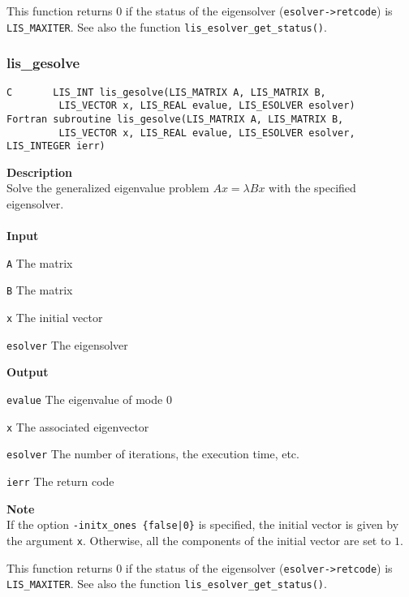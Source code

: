 \documentclass[a4paper]{article}
\newcommand{\namelistlabel}[1]{\mbox{#1}\hfill}
\newenvironment{namelist}[1]{%
\begin{list}{}
  {\let\makelabel\namelistlabel
  \settowidth{\labelwidth}{#1}
  \setlength{\leftmargin}{1.1\labelwidth}}
  }{%
\end{list}}
\begin{document}
This function returns 0 if the status of the eigensolver ({\tt esolver->retcode})
is {\tt LIS\_MAXITER}. See also the function
{\tt lis\_esolver\_get\_status()}. 

\newpage
\subsubsection{lis\_gesolve}
\begin{screen}
\verb|C       LIS_INT lis_gesolve(LIS_MATRIX A, LIS_MATRIX B,|\\ 
\verb|         LIS_VECTOR x, LIS_REAL evalue, LIS_ESOLVER esolver)|\\
\verb|Fortran subroutine lis_gesolve(LIS_MATRIX A, LIS_MATRIX B,|\\
\verb|         LIS_VECTOR x, LIS_REAL evalue, LIS_ESOLVER esolver, LIS_INTEGER ierr)|
\end{screen}
{\bf Description}\\
\indent
Solve the generalized eigenvalue problem $Ax = \lambda Bx$ with the specified eigensolver.
\\ \\
\noindent
{\bf Input}
\begin{namelist}{XXXXXXXXXXXXXXXXXXXX}
\item[\tt A] The matrix
\item[\tt B] The matrix  
\item[\tt x] The initial vector
\item[\tt esolver] The eigensolver
\end{namelist}
{\bf Output}
\begin{namelist}{XXXXXXXXXXXXXXXXXXXX}
\item[\tt evalue] The eigenvalue of mode 0
\item[\tt x] The associated eigenvector
\item[\tt esolver] The number of iterations, the execution time, etc.
\item[\tt ierr] The return code
\end{namelist}
{\bf Note}\\
\indent
If the option {\tt -initx\_ones \{false|0\}} is specified, the initial
vector is given by the argument {\tt x}.
Otherwise, all the components of the initial vector are set to $1$. 

This function returns 0 if the status of the eigensolver ({\tt esolver->retcode})
is {\tt LIS\_MAXITER}. See also the function
{\tt lis\_esolver\_get\_status()}. 

\newpage
\end{document}
